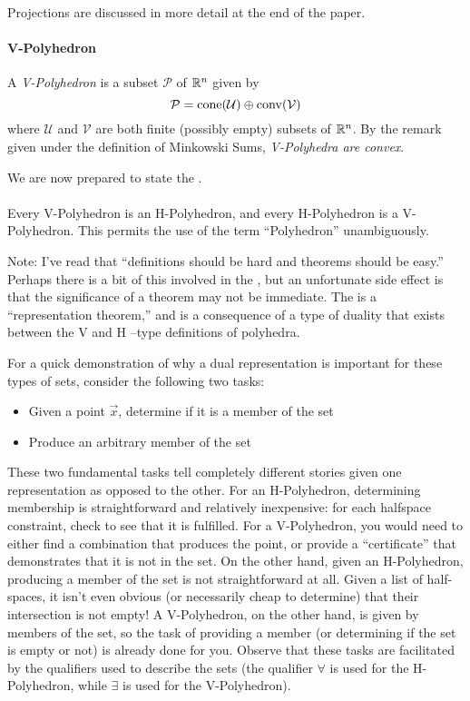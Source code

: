 Projections are discussed in more detail at the end of the paper.

\paragraph{V-Polyhedron}  A \textit{V-Polyhedron} is a subset $\mathcal{P}$ of $\mathbb{R}^n$ given by 
  \[ \mathcal{P} = \operatorname{cone}(\mathcal{U}) \oplus \operatorname{conv}(\mathcal{V}) \] 
where $\mathcal{U}$ and $\mathcal{V}$ are both finite (possibly empty) subsets of $\mathbb{R}^n$.  By the remark given under the definition of Minkowski Sums, \textit{V-Polyhedra are convex}.

\bigskip
\noindent We are now prepared to state the \MWT.

\paragraph{\MWT}
Every V-Polyhedron is an H-Polyhedron, and every H-Polyhedron is a V-Polyhedron.  This permits the use of the term ``Polyhedron'' unambiguously.
\medskip

Note:  I've read that ``definitions should be hard and theorems should be easy.''  Perhaps there is a bit of this involved in the \MWT{}, but an unfortunate side effect is that the significance of a theorem may not be immediate.  The \MWT{} is a ``representation theorem,'' and is a consequence of a type of duality that exists between the V and H --type definitions of polyhedra.

For a quick demonstration of why a dual representation is important for these types of sets, consider the following two tasks:
\begin{itemize}
  \item Given a point $\vec{x}$, determine if it is a member of the set
  \item Produce an arbitrary member of the set
\end{itemize}
These two fundamental tasks tell completely different stories given one representation as opposed to the other.  For an H-Polyhedron, determining membership is straightforward and relatively inexpensive: for each halfspace constraint, check to see that it is fulfilled.  For a V-Polyhedron, you would need to either find a combination that produces the point, or provide a ``certificate'' that demonstrates that it is not in the set.  On the other hand, given an H-Polyhedron, producing a member of the set is not straightforward at all.  Given a list of half-spaces, it isn't even obvious (or necessarily cheap to determine) that their intersection is not empty!  A V-Polyhedron, on the other hand, is given by members of the set, so the task of providing a member (or determining if the set is empty or not) is already done for you.  Observe that these tasks are facilitated by the qualifiers used to describe the sets (the qualifier $\forall$ is used for the H-Polyhedron, while $\exists$ is used for the V-Polyhedron).

